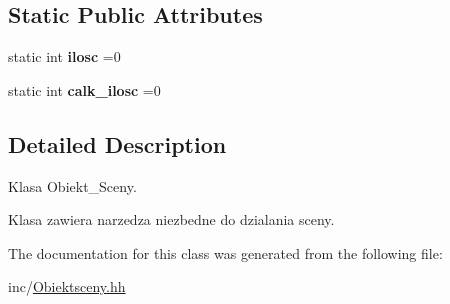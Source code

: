 \subsection*{Static Public Attributes}
\begin{DoxyCompactItemize}
\item 
\mbox{\label{class_obiekt__sceny_ac505dc25fa22f2d425066de12458e8fb}} 
static int {\bfseries ilosc} =0
\item 
\mbox{\label{class_obiekt__sceny_a1093ae133792401e22e3481efa1d5e39}} 
static int {\bfseries calk\+\_\+ilosc} =0
\end{DoxyCompactItemize}


\subsection{Detailed Description}
Klasa Obiekt\+\_\+\+Sceny. 

Klasa zawiera narzedza niezbedne do dzialania sceny. 

The documentation for this class was generated from the following file\+:\begin{DoxyCompactItemize}
\item 
inc/\mbox{\hyperlink{_obiektsceny_8hh}{Obiektsceny.\+hh}}\end{DoxyCompactItemize}
